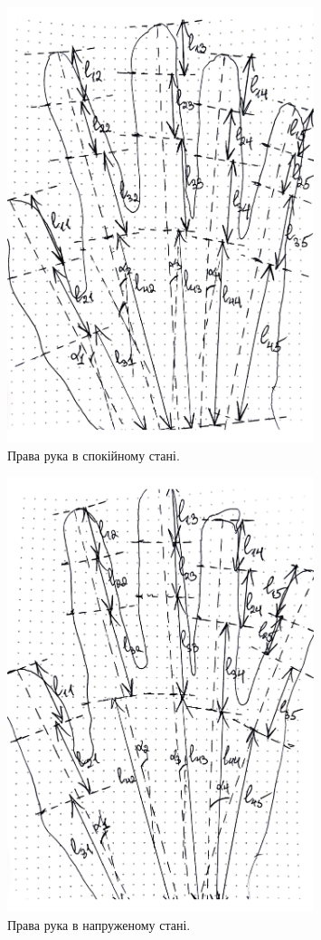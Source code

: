 \documentclass{hw_template}
\begin{document}
\begin{figure}[H]
    \centering
    \includegraphics[width=0.8\textwidth]{images/right_rest.pdf}
    \caption{Права рука в спокійному стані.}
\end{figure}

\begin{figure}[H]
    \centering
    \includegraphics[width=0.8\textwidth]{images/right_stressed.pdf}
    \caption{Права рука в напруженому стані.}
\end{figure}
\end{document}
